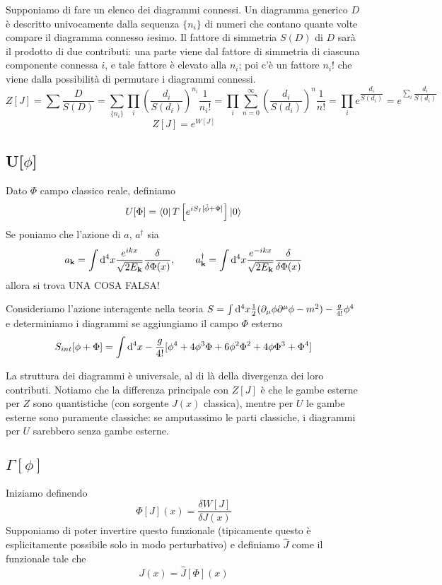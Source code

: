 \documentclass[a4paper, 11pt]{article}
\begin{document}
	Supponiamo di fare un elenco dei diagrammi connessi. Un diagramma generico $D$ è descritto univocamente dalla sequenza $\{n_i\}$ di numeri che contano quante volte compare il diagramma connesso $i$esimo. Il fattore di simmetria $S(D)$ di $D$ sarà il prodotto di due contributi: una parte viene dal fattore di simmetria di ciascuna componente connessa $i$, e tale fattore è elevato alla $n_i$; poi c'è un fattore $n_i!$ che viene dalla possibilità di permutare i diagrammi connessi.
	\[ Z[J] = \sum \dfrac{D}{S(D)} = \sum_{\{n_i\}} \prod_i \left(\dfrac{d_i}{S(d_i)}\right)^{n_i}\frac{1}{n_i!} = \prod_i \sum_{n=0}^{\infty} \left( \dfrac{d_i}{S(d_i)} \right)^n \dfrac{1}{n!} = \prod_{i} e^{\dfrac{d_i}{S(d_i)}} = e^{\sum_i \dfrac{d_i}{S(d_i)}} \]
	\[ Z[J] = e^{W[J]} \]
	
	\subsection{U[$\phi$]}
	Dato $\Phi$ campo classico reale, definiamo
	\[ U[\Phi] = \left\langle 0\right|T\left[e^{iS_I[\hat{\phi}+\Phi]}\right]\left| 0\right\rangle \]%
	Se poniamo che l'azione di $a$, $a^\dagger$ sia
	\[ a_\mathbf{k} = \int\mathrm{d}^4x \dfrac{e^{ikx}}{\sqrt{2E_\mathbf{k}}} \dfrac{\delta}{\delta \Phi(x)},\qquad
	a_\mathbf{k}^\dagger = \int\mathrm{d}^4x \dfrac{e^{-ikx}}{\sqrt{2E_\mathbf{k}}} \dfrac{\delta}{\delta \Phi(x)} \]
	allora si trova UNA COSA FALSA!%
	
	Consideriamo l'azione interagente nella teoria $S = \int \mathrm{d}^4x \frac{1}{2}(\partial_\mu\phi\partial^\mu\phi-m^2)-\frac{g}{4!}\phi^4$ e determiniamo i diagrammi se aggiungiamo il campo $\Phi$ esterno
	\[ S_{int}[\phi+\Phi] = \int\mathrm{d}^4x -\frac{g}{4!} [\phi^4+4\phi^3\Phi+6\phi^2\Phi^2+4\phi\Phi^3+\Phi^4] \]
	
	La struttura dei diagrammi è universale, al di là della divergenza dei loro contributi. Notiamo che la differenza principale con $Z[J]$ è che le gambe esterne per $Z$ sono quantistiche (con sorgente $J(x)$ classica), mentre per $U$ le gambe esterne sono puramente classiche: se amputassimo le parti classiche, i diagrammi per $U$ sarebbero senza gambe esterne.
	
	\subsection{$\Gamma[\phi]$}
	Iniziamo definendo
	\[ \Phi[J](x) = \dfrac{\delta W[J]}{\delta J(x)} \]
	Supponiamo di poter invertire questo funzionale (tipicamente questo è esplicitamente possibile solo in modo perturbativo) e definiamo $\hat{J}$ come il funzionale tale che
	\[ J(x) = \hat{J}[\Phi](x) \]
	
\end{document}
